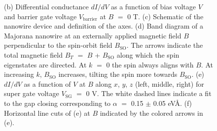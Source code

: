 \begin{figure}
{(b) Differential conductance $dI/dV$ as a function of bias voltage $V$ and barrier gate voltage $V_{\mathrm{barrier}}$ at $B$ $=$ 0 T.
(c) Schematic of the nanowire device and definition of the axes.
(d) Band diagram of a Majorana nanowire at an externally applied magnetic field $B$ perpendicular to the spin-orbit field $B_{\mathrm{SO}}$.
The arrows indicate the total magnetic field $B_T$ $=$ $B$ + $B_{\mathrm{SO}}$ along which the spin eigenstates are directed.
At $k$ $=$ 0 the spin always aligns with $B$.
At increasing $k$, $B_{\mathrm{SO}}$ increases, tilting the spin more towards $B_{\mathrm{SO}}$.
(e) $dI/dV$ as a function of $V$ at $B$ along $x$, $y$, $z$ (left, middle, right) for super gate voltage $V_{\mathrm{SG}}$ $=$ 0 V.
The white dashed lines indicate a fit to the gap closing corresponding to $\alpha$ $=$ 0.15 $\pm$ 0.05 eV\AA.
(f) Horizontal line cuts of (e) at $B$ indicated by the colored arrows in (e).
}
\end{figure}

